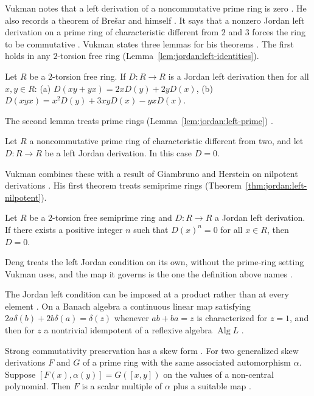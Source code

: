 Vukman notes that a left derivation of a noncommutative prime ring is zero
\cite[p.~1]{Vukman1997}. He also records a theorem of Brešar and himself
\cite[p.~1]{Vukman1997}. It says that a nonzero Jordan left derivation on a
prime ring of characteristic different from $2$ and $3$ forces the ring to be
commutative \cite[p.~1]{Vukman1997}. Vukman states three lemmas for his
theorems \cite[p.~2]{Vukman1997}. The first holds in any $2$-torsion free ring
(Lemma~\ref{lem:jordan:left-identities}).

\begin{lemma}\label{lem:jordan:left-identities}
Let $R$ be a $2$-torsion free ring. If $D\colon R\to R$ is a Jordan left derivation then for all
$x,y\in R$: (a) $D(xy+yx)=2xD(y)+2yD(x)$, (b) $D(xyx)=x^{2}D(y)+3xyD(x)-yxD(x)$.
\end{lemma}

The second lemma treats prime rings (Lemma~\ref{lem:jordan:left-prime})
\cite[p.~2]{Vukman1997}.

\begin{lemma}\label{lem:jordan:left-prime}
Let $R$ a noncommutative prime ring of characteristic different from two, and let $D\colon R\to R$ be a
left Jordan derivation. In this case $D=0$.
\end{lemma}

Vukman combines these with a result of Giambruno and Herstein on nilpotent
derivations \cite[p.~1]{Vukman1997}. His first theorem treats semiprime rings
(Theorem~\ref{thm:jordan:left-nilpotent}).

\begin{theorem}\label{thm:jordan:left-nilpotent}
Let $R$ be a $2$-torsion free semiprime ring and $D\colon R\to R$ a Jordan left derivation. If there
exists a positive integer $n$ such that $D(x)^{n}=0$ for all $x\in R$, then $D=0$.
\end{theorem}

Deng treats the left Jordan condition on its own, without the prime-ring
setting Vukman uses, and the map it governs is the one the definition above
names \cite[Abstract]{Deng1992JordanLeft}.

The Jordan left condition can be imposed at a product rather than at every
element \cite[Abstract]{ContinuousLinearReflexive2013}. On a Banach algebra a
continuous linear map satisfying $2a\delta(b)+2b\delta(a)=\delta(z)$ whenever
$ab+ba=z$ is characterized for $z=1$, and then for $z$ a nontrivial idempotent
of a reflexive algebra $\operatorname{Alg}L$
\cite[Abstract]{ContinuousLinearReflexive2013}.

Strong commutativity preservation has a skew form
\cite[Abstract]{AutomorphismsGeneralizedSkew2016}. For two generalized skew
derivations $F$ and $G$ of a prime ring with the same associated automorphism
$\alpha$. Suppose $[F(x),\alpha(y)]=G([x,y])$ on the values of a non-central
polynomial. Then $F$ is a scalar multiple of $\alpha$ plus a suitable map
\cite[Abstract]{AutomorphismsGeneralizedSkew2016}.

